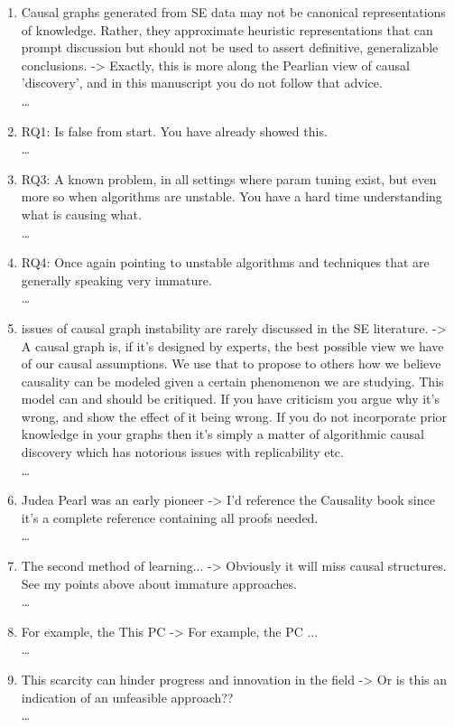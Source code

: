 \documentclass[]{svjour3}
\begin{document}
\begin{enumerate}
\begin{enumerate}
        \item Causal graphs generated from SE data may not be canonical representations of knowledge. Rather, they approximate heuristic representations that can prompt discussion but should not be used to assert definitive, generalizable conclusions. -> Exactly, this is more along the Pearlian view of causal 'discovery', and in this manuscript you do not follow that advice.\\{\MARK \dots}
        \item RQ1: Is false from start. You have already showed this.\\{\MARK \dots}
        \item RQ3: A known problem, in all settings where param tuning exist, but even more so when algorithms are unstable. You have a hard time understanding what is causing what.\\{\MARK \dots}
        \item RQ4: Once again pointing to unstable algorithms and techniques that are generally speaking very immature.\\{\MARK \dots}
        \item  issues of causal graph instability are rarely discussed in the SE literature. -> A causal graph is, if it's designed by experts, the best possible view we have of our causal assumptions. We use that to propose to others how we believe causality can be modeled given a certain phenomenon we are studying. This model can and should be critiqued. If you have criticism you argue why it's wrong, and show the effect of it being wrong. If you do not incorporate prior knowledge in your graphs then it's simply a matter of algorithmic causal discovery which has notorious issues with replicability etc.\\{\MARK \dots}
        \item Judea Pearl was an early pioneer -> I'd reference the Causality book since it's a complete reference containing all proofs needed.\\{\MARK \dots}
        \item The second method of learning... -> Obviously it will miss causal structures. See my points above about immature approaches.\\{\MARK \dots}
        \item For example, the This PC -> For example, the PC ...\\{\MARK \dots}
        \item This scarcity can hinder progress and innovation in the field -> Or is this an indication of an unfeasible approach??\\{\MARK \dots}

\end{enumerate}
\end{enumerate}
\end{document}
